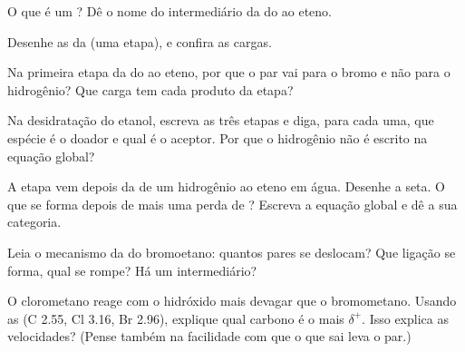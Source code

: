 \begin{exercise}[$\star$]\label{exo:g12:curly-arrows:5}
O que é um ? Dê o nome do intermediário da 
do  ao eteno.
\end{exercise}

\begin{exercise}[$\star\star$]\label{exo:g12:curly-arrows:6}
Desenhe as  da 
 (uma etapa), e confira as cargas.
\end{exercise}

\begin{exercise}[$\star\star$]\label{exo:g12:curly-arrows:7}
Na primeira etapa da  do  ao eteno, por que o par
 vai para o bromo e não para o hidrogênio? Que carga tem cada
produto da etapa?
\end{exercise}

\begin{exercise}[$\star\star$]\label{exo:g12:curly-arrows:8}
Na desidratação do etanol, escreva as três etapas e diga, para cada uma,
que espécie é o doador e qual é o aceptor. Por que o  hidrogênio não
é escrito na equação global?
\end{exercise}

\begin{exercise}[$\star\star$]\label{exo:g12:curly-arrows:9}
A etapa  vem depois da  de um
 hidrogênio ao eteno em água. Desenhe a seta. O que se forma depois
de mais uma perda de ? Escreva a equação global e dê a sua
categoria.
\end{exercise}

\begin{exercise}[$\star\star$]\label{exo:g12:curly-arrows:10}
Leia o mecanismo da  do bromoetano: quantos pares se
deslocam? Que ligação se forma, qual se rompe? Há um intermediário?
\end{exercise}

\begin{exercise}[$\star\star$]\label{exo:g12:curly-arrows:11}
O clorometano reage com o  hidróxido mais devagar que o bromometano.
Usando as  (C 2.55, Cl 3.16, Br 2.96), explique qual
carbono é o mais $\delta^+$. Isso explica as velocidades? (Pense também
na facilidade com que o  que sai leva o par.)
\end{exercise}

